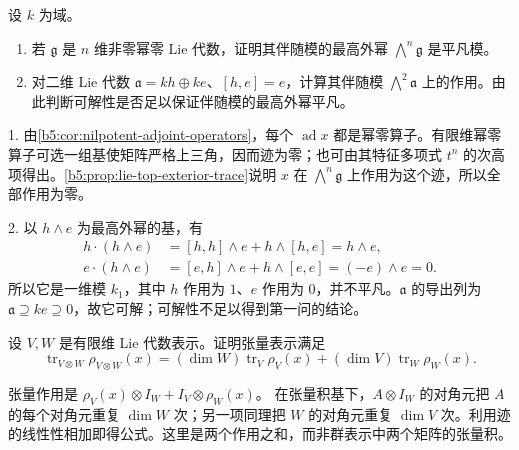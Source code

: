 \begin{exercise}\label{b5:ex:11-top-exterior-character}
	设 \(k\) 为域。
	\begin{enumerate}
		\item 若 \(\mathfrak g\) 是 \(n\) 维非零幂零 Lie 代数，证明其伴随模的最高外幂 \(\bigwedge^n\mathfrak g\) 是平凡模。
		\item 对二维 Lie 代数 \(\mathfrak a=kh\oplus ke\)、\([h,e]=e\)，计算其伴随模 \(\bigwedge^2\mathfrak a\) 上的作用。由此判断可解性是否足以保证伴随模的最高外幂平凡。
	\end{enumerate}
\end{exercise}
\begin{solution}
	1. 由\cref{b5:cor:nilpotent-adjoint-operators}，每个 \(\operatorname{ad}x\) 都是幂零算子。有限维幂零算子可选一组基使矩阵严格上三角，因而迹为零；也可由其特征多项式 \(t^n\) 的次高项得出。\cref{b5:prop:lie-top-exterior-trace}说明 \(x\) 在 \(\bigwedge^n\mathfrak g\) 上作用为这个迹，所以全部作用为零。

	2. 以 \(h\wedge e\) 为最高外幂的基，有
	\[
		\begin{aligned}
			h\cdot(h\wedge e)&=[h,h]\wedge e+h\wedge[h,e]=h\wedge e,\\
			e\cdot(h\wedge e)&=[e,h]\wedge e+h\wedge[e,e]=(-e)\wedge e=0.
		\end{aligned}
	\]
	所以它是一维模 \(k_1\)，其中 \(h\) 作用为 \(1\)、\(e\) 作用为 \(0\)，并不平凡。\(\mathfrak a\) 的导出列为 \(\mathfrak a\supseteq ke\supseteq0\)，故它可解；可解性不足以得到第一问的结论。
\end{solution}

\begin{exercise}\label{b5:ex:11-tensor-trace}
	设 \(V,W\) 是有限维 Lie 代数表示。证明张量表示满足
	\[
		\operatorname{tr}_{V\otimes W}\rho_{V\otimes W}(x) =(\dim W)\operatorname{tr}_V\rho_V(x) +(\dim V)\operatorname{tr}_W\rho_W(x).
	\]
\end{exercise}
\begin{solution}
	张量作用是 \(\rho_V(x)\otimes I_W+I_V\otimes\rho_W(x)\)。 在张量积基下，\(A\otimes I_W\) 的对角元把 \(A\) 的每个对角元重复 \(\dim W\) 次；另一项同理把 \(W\) 的对角元重复 \(\dim V\) 次。利用迹的线性性相加即得公式。这里是两个作用之和，而非群表示中两个矩阵的张量积。
\end{solution}

